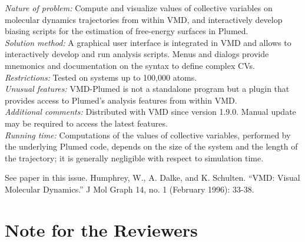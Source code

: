 \documentclass[preprint,review,11pt]{elsarticle}
\begin{document}
\begin{small}
  {\em Nature of problem:} Compute and visualize values of collective
  variables on molecular dynamics trajectories from within VMD, and
  interactively develop biasing scripts for the estimation of
  free-energy surfaces in Plumed.
  \\
  {\em Solution method:} A graphical user interface is integrated in
  VMD and allows to interactively develop and run analysis scripts.
  Menus and dialogs provide mnemonics and documentation on the syntax
  to define complex CVs.
  \\
  {\em Restrictions:}
  Tested on systems up to 100,000 atoms. \\
  {\em Unusual features:} VMD-Plumed is not a standalone program but a
  plugin that provides access to Plumed's analysis features from within VMD. \\
  {\em Additional comments:} Distributed with VMD since version 1.9.0.
  Manual  update may be required  to access the latest features.   \\
  {\em Running time:} Computations of the values of collective
  variables, performed by the underlying Plumed code, depends on the
  size of the system and the length  of the trajectory; it is 
  generally negligible with respect to simulation time.  \\
\begin{thebibliography}{0}
See paper in this issue.
Humphrey, W., A. Dalke, and K. Schulten. ``VMD: Visual
  Molecular Dynamics.'' J Mol Graph 14, no. 1 (February 1996): 33-38.
\end{thebibliography}

\end{small}


\vspace{2cm}

\section*{Note for the Reviewers}
\end{document}
